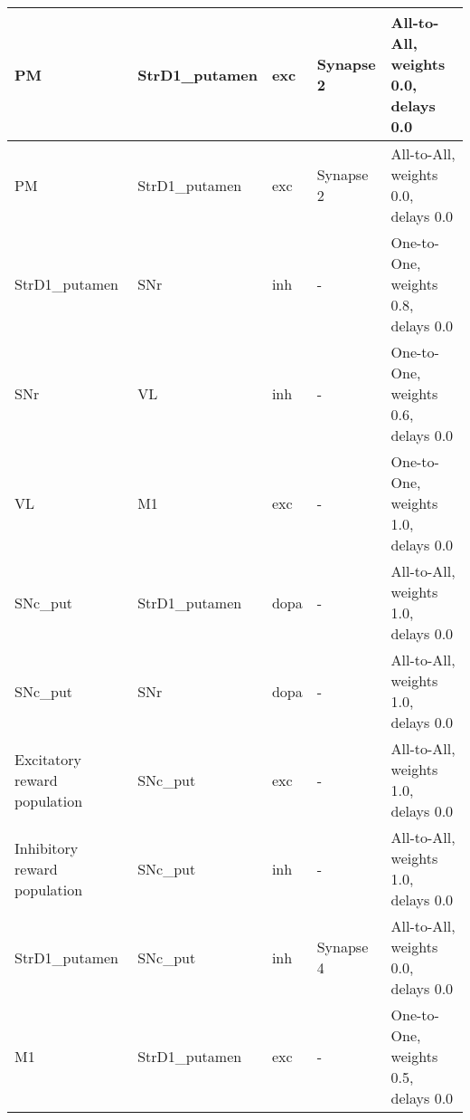 \documentclass{article}
\begin{document}
\begin{tabularx}{\linewidth}{|l|l|l|X|X|}
    PM & StrD1\_putamen & exc & Synapse 2 &
    All-to-All, weights 0.0, delays 0.0 \\ \hline

    PM & StrD1\_putamen & exc & Synapse 2 &
    All-to-All, weights 0.0, delays 0.0 \\ \hline

    StrD1\_putamen & SNr & inh & - &
    One-to-One, weights 0.8, delays 0.0 \\ \hline

    SNr & VL & inh & - &
    One-to-One, weights 0.6, delays 0.0 \\ \hline

    VL & M1 & exc & - &
    One-to-One, weights 1.0, delays 0.0 \\ \hline

    SNc\_put & StrD1\_putamen & dopa & - &
    All-to-All, weights 1.0, delays 0.0 \\ \hline

    SNc\_put & SNr & dopa & - &
    All-to-All, weights 1.0, delays 0.0 \\ \hline

    Excitatory reward population & SNc\_put & exc & - &
    All-to-All, weights 1.0, delays 0.0 \\ \hline

    Inhibitory reward population & SNc\_put & inh & - &
    All-to-All, weights 1.0, delays 0.0 \\ \hline

    StrD1\_putamen & SNc\_put & inh & Synapse 4 &
    All-to-All, weights 0.0, delays 0.0 \\ \hline

    M1 & StrD1\_putamen & exc & - &
    One-to-One, weights 0.5, delays 0.0 \\ \hline

\end{tabularx}

\vspace{2ex}
\end{document}
